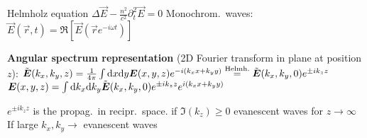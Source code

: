 \begin{squishlist}
    \item Helmholz equation $\Delta \vec{E} - \frac{n^2}{c^2} \partial_t^2 \vec{E} = 0$ \hspace{-0.3cm}
    \squishsep Monochrom.\ waves: $\vec{E}({\vec{r}, t}) = \Re[\vec{E}(\vec{r}e^{-i \omega t})]$
    \item \textbf{Angular spectrum representation} (2D Fourier transform in plane at position $z$): $\tilde{\bm{E}}(k_x, k_y, z) = \frac{1}{4\pi} \int \textrm{d} x \textrm{d} y \bm{E}(x,y,z) e^{-i(k_xx+k_yy)} \overset{\text{Helmh.}}{=} \tilde{\bm{E}}(k_x, k_y, 0) e^{\pm i k_z z}$ \\
    $\bm{E}(x,y,z) = \int \textrm{d} k_x \textrm{d} k_y \tilde{\bm{E}}(k_x,k_y,0)e^{\pm ik_z z} e^{i(k_x x + k_y y)}$
    \item $e^{\pm i k_z z}$ is the propag.\ in recipr.\ space. \squishsep if $\Im(k_z) \geq 0$ evanescent waves for $z \rightarrow \infty$ \\
    If large $k_x,k_y \rightarrow$ evanescent waves
\end{squishlist}
